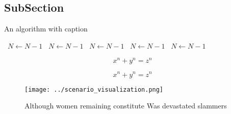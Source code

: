 \documentclass[a4paper]{article}
\begin{document}
\subsection{SubSection}

\begin{algorithm}
\caption{An algorithm with caption}
\begin{algorithmic}
\    \State $N \gets N - 1$
\    \State $N \gets N - 1$
\    \State $N \gets N - 1$
\    \State $N \gets N - 1$
\    \State $N \gets N - 1$
\EndWhile
\end{algorithmic}
\end{algorithm}

\[ x^n + y^n = z^n \]

\[ x^n + y^n = z^n \]

\begin{figure}
\centering
\texttt{[image: ../scenario\_visualization.png]}
\caption{Although women remaining constitute Was devastated slammers
}
\end{figure}
 
\end{document}
